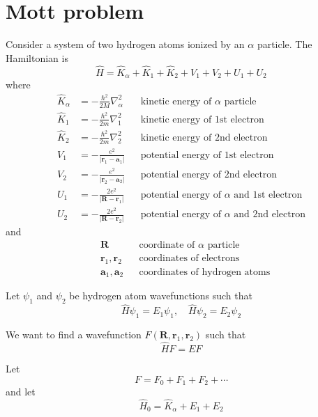 \documentclass[12pt]{article}
\begin{document}
\section*{Mott problem}

Consider a system of two hydrogen atoms ionized by an $\alpha$ particle.
The Hamiltonian is
\begin{equation*}
\hat H=\hat K_\alpha+\hat K_1+\hat K_2+V_1+V_2+U_1+U_2
\end{equation*}
where
\begin{align*}
\hat K_\alpha&=-\frac{\hbar^2}{2M}\nabla_\alpha^2 & & \text{kinetic energy of $\alpha$ particle}
\\[1ex]
\hat K_1&=-\frac{\hbar^2}{2m}\nabla_1^2 & & \text{kinetic energy of 1st electron}
\\[1ex]
\hat K_2&=-\frac{\hbar^2}{2m}\nabla_2^2 & & \text{kinetic energy of 2nd electron}
\\[1ex]
V_1&=-\frac{e^2}{|\mathbf r_1-\mathbf a_1|} & & \text{potential energy of 1st electron}
\\[1ex]
V_2&=-\frac{e^2}{|\mathbf r_2-\mathbf a_2|} & & \text{potential energy of 2nd electron}
\\[1ex]
U_1&=-\frac{2e^2}{|\mathbf R-\mathbf r_1|} & & \text{potential energy of $\alpha$ and 1st electron}
\\[1ex]
U_2&=-\frac{2e^2}{|\mathbf R-\mathbf r_2|} & & \text{potential energy of $\alpha$ and 2nd electron}
\end{align*}
and
\begin{align*}
& \mathbf R & & \text{coordinate of $\alpha$ particle}
\\
& \mathbf r_1,\mathbf r_2 & & \text{coordinates of electrons}
\\
& \mathbf a_1,\mathbf a_2 & & \text{coordinates of hydrogen atoms}
\end{align*}

Let $\psi_1$ and $\psi_2$ be hydrogen atom wavefunctions such that
\begin{equation*}
\hat H\psi_1=E_1\psi_1,
\quad
\hat H\psi_2=E_2\psi_2
\end{equation*}

We want to find a wavefunction $F(\mathbf R,\mathbf r_1,\mathbf r_2)$ such that
\begin{equation*}
\hat HF=EF
\end{equation*}

Let
\begin{equation*}
F=F_0+F_1+F_2+\cdots
\end{equation*}
and let
\begin{equation*}
\hat H_0=\hat K_\alpha+E_1+E_2
\end{equation*}
\end{document}
